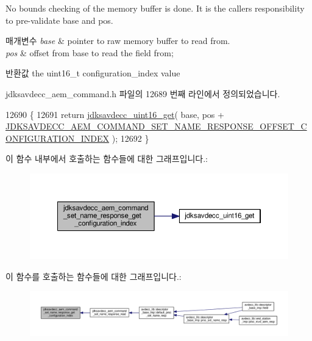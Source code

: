 No bounds checking of the memory buffer is done. It is the caller\textquotesingle{}s responsibility to pre-\/validate base and pos.


\begin{DoxyParams}{매개변수}
{\em base} & pointer to raw memory buffer to read from. \\
\hline
{\em pos} & offset from base to read the field from; \\
\hline
\end{DoxyParams}
\begin{DoxyReturn}{반환값}
the uint16\+\_\+t configuration\+\_\+index value 
\end{DoxyReturn}


jdksavdecc\+\_\+aem\+\_\+command.\+h 파일의 12689 번째 라인에서 정의되었습니다.


\begin{DoxyCode}
12690 \{
12691     \textcolor{keywordflow}{return} \hyperlink{group__endian_ga3fbbbc20be954aa61e039872965b0dc9}{jdksavdecc\_uint16\_get}( base, pos + 
      \hyperlink{group__command__set__name__response_ga1e3553576702f286b6c0a714b06fa61d}{JDKSAVDECC\_AEM\_COMMAND\_SET\_NAME\_RESPONSE\_OFFSET\_CONFIGURATION\_INDEX}
       );
12692 \}
\end{DoxyCode}


이 함수 내부에서 호출하는 함수들에 대한 그래프입니다.\+:
\nopagebreak
\begin{figure}[H]
\begin{center}
\leavevmode
\includegraphics[width=350pt]{group__command__set__name__response_ga955980672080aa93ba297af1ce8cfbde_cgraph}
\end{center}
\end{figure}




이 함수를 호출하는 함수들에 대한 그래프입니다.\+:
\nopagebreak
\begin{figure}[H]
\begin{center}
\leavevmode
\includegraphics[width=350pt]{group__command__set__name__response_ga955980672080aa93ba297af1ce8cfbde_icgraph}
\end{center}
\end{figure}


